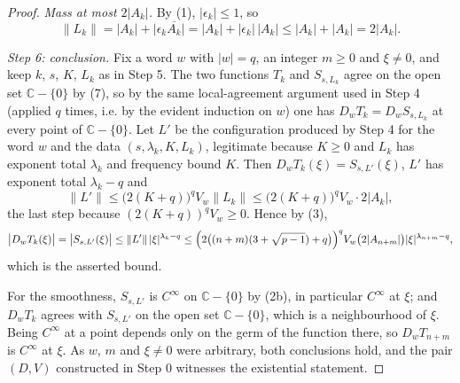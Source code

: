 \begin{proof}
\emph{Mass at most $2|A_k|$.}  By (1), $|\epsilon_k|\le1$, so
\[
  \|L_k\|=|A_k|+\bigl|\epsilon_k\overline{A_k}\bigr|
  =|A_k|+|\epsilon_k|\,|A_k|\le|A_k|+|A_k|=2|A_k| .
\]

\emph{Step 6: conclusion.}  Fix a word $w$ with $|w|=q$, an integer $m\ge0$
and $\xi\ne0$, and keep $k$, $s$, $K$, $L_k$ as in Step 5.  The two functions
$T_k$ and $S_{s,L_k}$ agree on the open set $\mathbb{C}-\{0\}$ by (7), so by
the same local-agreement argument used in Step 4 (applied $q$ times, i.e. by
the evident induction on $w$) one has $D_wT_k=D_wS_{s,L_k}$ at every point of
$\mathbb{C}-\{0\}$.  Let $L'$ be the configuration produced by Step 4 for the
word $w$ and the data $(s,\lambda_k,K,L_k)$, legitimate because $K\ge0$ and
$L_k$ has exponent total $\lambda_k$ and frequency bound $K$.  Then
$D_wT_k(\xi)=S_{s,L'}(\xi)$, $L'$ has exponent total $\lambda_k-q$ and
\[
  \|L'\|\le\bigl(2(K+q)\bigr)^{q}V_w\|L_k\|
  \le\bigl(2(K+q)\bigr)^{q}V_w\cdot2|A_k| ,
\]
the last step because $(2(K+q))^{q}V_w\ge0$.  Hence by (3),
\[
  \bigl|D_wT_k(\xi)\bigr|=\bigl|S_{s,L'}(\xi)\bigr|
  \le\|L'\|\,|\xi|^{\lambda_k-q}
  \le\Bigl(2\bigl((n+m)(3+\sqrt{p-1})+q\bigr)\Bigr)^{q}V_w
     \bigl(2|A_{n+m}|\bigr)|\xi|^{\lambda_{n+m}-q},
\]
which is the asserted bound.

For the smoothness, $S_{s,L'}$ is $C^\infty$ on $\mathbb{C}-\{0\}$ by (2b), in
particular $C^\infty$ at $\xi$; and $D_wT_k$ agrees with $S_{s,L'}$ on the
open set $\mathbb{C}-\{0\}$, which is a neighbourhood of $\xi$.  Being
$C^\infty$ at a point depends only on the germ of the function there, so
$D_wT_{n+m}$ is $C^\infty$ at $\xi$.  As $w$, $m$ and $\xi\ne0$ were
arbitrary, both conclusions hold, and the pair $(D,V)$ constructed in Step 0
witnesses the existential statement.
\end{proof}
